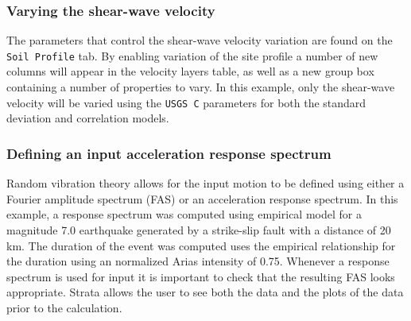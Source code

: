 \documentclass[12pt,oneside]{book}
\begin{document}
\subsubsection{Varying the shear-wave velocity}
The parameters that control the shear-wave velocity variation are found on the \texttt{Soil Profile}
tab.  By enabling variation of the site profile a number of new columns will appear in the velocity
layers table, as well as a new group box containing a number of properties to vary.  In this
example, only the shear-wave velocity will be varied using the \texttt{USGS C} parameters for both
the standard deviation and correlation models.

\subsubsection{Defining an input acceleration response spectrum}
Random vibration theory allows for the input motion to be defined using either a Fourier amplitude
spectrum (FAS) or an acceleration response spectrum.  In this example, a response spectrum was computed
using \citet{abrahamson:97} empirical model for a magnitude 7.0 earthquake generated by a
strike-slip fault with a distance of 20 km.  The duration of the event was computed uses the
\citet{abrahamson:96} empirical relationship for the duration using an normalized Arias intensity of
0.75.  Whenever a response spectrum is used for input it is important to check that the resulting
FAS looks appropriate.  Strata allows the user to see both the data and the plots of the data prior
to the calculation.


\newpage


\backmatter
\printindex
\end{document}
